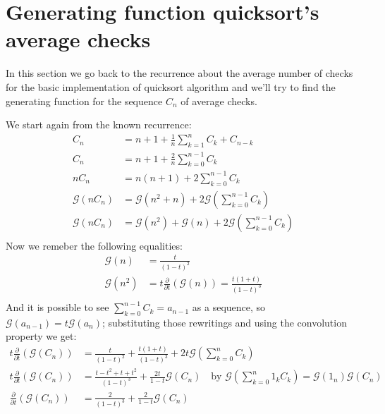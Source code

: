 
\section{Generating function quicksort's average checks }
In this section we go back to the recurrence about the average number
of checks for the basic implementation of quicksort algorithm and
we'll try to find the generating function for the sequence $C_n$ of
average checks.

We start again from the known recurrence:
\begin{displaymath}
  \begin{split}
    C_n &= n+1 +  \frac{1}{n}\sum_{k=1}^{n}{C_k + C_{n-k}}  \\
    C_n &= n+1 +  \frac{2}{n}\sum_{k=0}^{n-1}{C_k}  \\
    nC_n &= n(n+1) + 2\sum_{k=0}^{n-1}{C_k}  \\
    \mathcal{G} (nC_n) &= \mathcal{G} (n^2+n) +
    2\mathcal{G} \left(\sum_{k=0}^{n-1}{C_k} \right) \\
    \mathcal{G} (nC_n) &= \mathcal{G} (n^2) +\mathcal{G} (n) +
    2\mathcal{G} \left(\sum_{k=0}^{n-1}{C_k} \right) \\
  \end{split}
\end{displaymath}
Now we remeber the following equalities:
\begin{displaymath}
  \begin{split}
    \mathcal{G} (n) &=  \frac{t}{(1-t)^2} \\
    \mathcal{G} (n^2) &=
    t\frac{\partial}{\partial t}(\mathcal{G} (n)) =
    \frac{t(1+t)}{(1-t)^3} \\
  \end{split}
\end{displaymath}
And it is possible to see $\sum_{k=0}^{n-1}{C_k} = a_{n-1}$ as a
sequence, so $\mathcal{G} (a_{n-1}) = t \mathcal{G} (a_n)$;
substituting those rewritings and using the convolution property we
get:
\begin{displaymath}
  \begin{split}
    t \frac{\partial}{\partial t}\left( \mathcal{G} (C_n) \right) &=
    \frac{t}{(1-t)^2} + \frac{t(1+t)}{(1-t)^3} + 2t\mathcal{G}
    \left(\sum_{k=0}^{n}{C_k} \right)\\
    t \frac{\partial}{\partial t}\left( \mathcal{G} (C_n) \right) &=
    \frac{t -t^2+ t+t^2}{(1-t)^3} + \frac{2t}{1-t} \mathcal{G}
    \left(C_n \right) \quad \text{by } \mathcal{G}
    \left(\sum_{k=0}^{n}{1_k C_k} \right)=\mathcal{G} (1_n)\mathcal{G} (C_n)\\
    \frac{\partial}{\partial t}\left( \mathcal{G} (C_n) \right) &=
    \frac{2}{(1-t)^3} + \frac{2}{1-t} \mathcal{G}
    \left(C_n \right)\\
  \end{split}
\end{displaymath}
